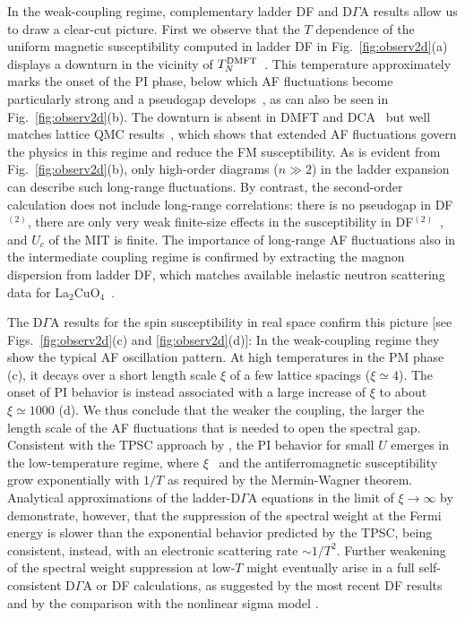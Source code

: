 \documentclass[rmp,aps,reprint,amsmath,amssymb,superscriptaddress,showpacs,nofootinbib]{revtex4-1}
\begin{document}
In the weak-coupling regime, complementary ladder DF and D$\Gamma$A results allow us to draw a clear-cut picture. First we observe that the $T$ dependence of the uniform magnetic susceptibility computed in ladder DF in Fig.~\ref{fig:observ2d}(a) displays a downturn in the vicinity of $T_N^{\rm DMFT}$~\cite{vanLoon2017,LeBlanc2016_2}. This temperature approximately marks the onset of the PI phase, below which AF fluctuations become particularly strong and a pseudogap develops~\cite{Rost2012}, as can also be seen in Fig.~\ref{fig:observ2d}(b). The downturn is absent in DMFT and DCA~\cite{LeBlanc2016_2} but well matches lattice QMC results~\cite{Moreo1993}, which shows that extended AF fluctuations govern the physics in this regime and reduce the FM susceptibility. As is evident from Fig.~\ref{fig:observ2d}(b), only high-order diagrams ($n\gg2$) in the ladder expansion can describe such long-range fluctuations. By contrast, the second-order calculation does not include long-range correlations: there is no pseudogap in  DF$^{(2)}$, there are only very weak finite-size effects in the susceptibility in DF$^{(2)}$~\cite{Brener08,Li2008}, and  $U_c$ of the MIT is finite. The  importance of long-range AF fluctuations also in the intermediate coupling regime is confirmed by extracting   the magnon dispersion from ladder DF, which matches available inelastic neutron scattering data for La$_2$CuO$_4$~\cite{LeBlanc2016_2}. 
 
The D$\Gamma$A results for the spin susceptibility in real space confirm this picture [see Figs.~\ref{fig:observ2d}(c) and \ref{fig:observ2d}(d)]: In the weak-coupling regime they show the typical AF oscillation pattern. At high temperatures  in the PM phase (c), it decays over a short length scale $\xi$ of a few lattice spacings ($\xi \simeq 4$). The onset of PI behavior is instead associated with a large increase of $\xi$ to about $\xi \simeq 1000$ (d). We thus conclude that the weaker the coupling, the larger the length scale of the AF fluctuations that is needed to open the spectral gap. Consistent with the TPSC approach by , the PI behavior for small $U$ emerges in the low-temperature regime, where $\xi$~\cite{Schaefer2015-2} and the antiferromagnetic susceptibility~\cite{Otsuki2014} grow exponentially with $1/T$ as required by the Mermin-Wagner theorem. Analytical approximations of the ladder-D$\Gamma$A equations in the limit of $\xi \rightarrow \infty$ by  demonstrate, however, that the suppression of the spectral weight at the Fermi energy is slower than the exponential behavior predicted by the TPSC, being consistent, instead, with an electronic scattering rate $\sim 1/T^2$. Further weakening of the spectral weight suppression at low-$T$ might eventually arise in a full self-consistent D$\Gamma$A or DF calculations, as suggested by the most recent DF results \cite{vanLoon2017} and by the comparison with the nonlinear sigma model \cite{Borejsza2004}. 
\end{document}
